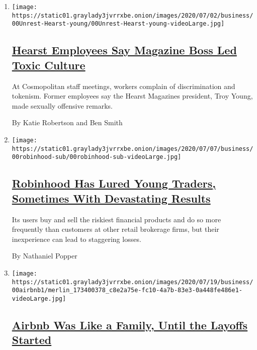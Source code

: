 \begin{enumerate}
\def\labelenumi{\arabic{enumi}.}
\item
  \texttt{[image: https://static01.graylady3jvrrxbe.onion/images/2020/07/02/business/00Unrest-Hearst-young/00Unrest-Hearst-young-videoLarge.jpg]}

  \hypertarget{hearst-employees-say-magazine-boss-led-toxic-culture}{%
  \subsection{\texorpdfstring{\href{/2020/07/22/business/media/hearst-harassment-troy-young.html}{Hearst
  Employees Say Magazine Boss Led Toxic
  Culture}}{Hearst Employees Say Magazine Boss Led Toxic Culture}}\label{hearst-employees-say-magazine-boss-led-toxic-culture}}

  At Cosmopolitan staff meetings, workers complain of discrimination and
  tokenism. Former employees say the Hearst Magazines president, Troy
  Young, made sexually offensive remarks.

  By Katie Robertson and Ben Smith
\item
  \texttt{[image: https://static01.graylady3jvrrxbe.onion/images/2020/07/07/business/00robinhood-sub/00robinhood-sub-videoLarge.jpg]}

  \hypertarget{robinhood-has-lured-young-traders-sometimes-with-devastating-results}{%
  \subsection{\texorpdfstring{\href{/2020/07/08/technology/robinhood-risky-trading.html}{Robinhood
  Has Lured Young Traders, Sometimes With Devastating
  Results}}{Robinhood Has Lured Young Traders, Sometimes With Devastating Results}}\label{robinhood-has-lured-young-traders-sometimes-with-devastating-results}}

  Its users buy and sell the riskiest financial products and do so more
  frequently than customers at other retail brokerage firms, but their
  inexperience can lead to staggering losses.

  By Nathaniel Popper
\item
  \texttt{[image: https://static01.graylady3jvrrxbe.onion/images/2020/07/19/business/00airbnb1/merlin\_173400378\_c8e2a75e-fc10-4a7b-83e3-0a448fe486e1-videoLarge.jpg]}

  \hypertarget{airbnb-was-like-a-family-until-the-layoffs-started}{%
  \subsection{\texorpdfstring{\href{/2020/07/17/technology/airbnb-coronavirus-layoffs-.html}{Airbnb
  Was Like a Family, Until the Layoffs
  Started}}{Airbnb Was Like a Family, Until the Layoffs Started}}\label{airbnb-was-like-a-family-until-the-layoffs-started}}


\end{enumerate}
